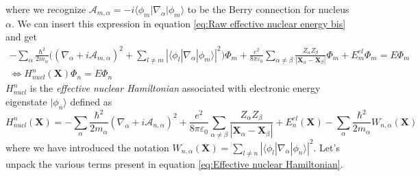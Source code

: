 \documentclass[11pt,a4paper]{article}
\begin{document}
where we recognize $\boldsymbol{\mathcal{A}}_{m,\alpha} = -i \langle\phi_m | \nabla_\alpha | \phi_m\rangle$ to be the Berry connection for nucleus $\alpha$.
We can insert this expression in equation \eqref{eq:Raw effective nuclear energy bis} and get
\begin{equation*}
	\begin{gathered}
		-\sum_\alpha \frac{\hbar^2}{2m_\alpha} \Big( (\nabla_\alpha + i\boldsymbol{\mathcal{A}}_{m,\alpha})^2 + \sum_{l \neq m} |\langle\phi_l | \nabla_\alpha | \phi_m\rangle|^2 \Big) \Phi_m + \frac{e^2}{8\pi\varepsilon_0} \sum_{\alpha \neq \beta} \frac{Z_\alpha Z_\beta}{|\mathbf{X}_\alpha - \mathbf{X}_\beta|} \Phi_m + E_m^{el} \Phi_m = E \Phi_m \\[6pt]
		\Leftrightarrow H_{nucl}^n(\mathbf{X}) \Phi_n = E \Phi_n
	\end{gathered}
\end{equation*}
$H_{nucl}^n$ is the \emph{effective nuclear Hamiltonian} associated with electronic energy eigenstate $|\phi_n\rangle$ defined as
\begin{equation}
	\label{eq:Effective nuclear Hamiltonian}
	H_{nucl}^n(\mathbf{X}) = -\sum_\alpha \frac{\hbar^2}{2m_\alpha} (\nabla_\alpha + i\boldsymbol{\mathcal{A}}_{n,\alpha})^2 + \frac{e^2}{8\pi\varepsilon_0} \sum_{\alpha \neq \beta} \frac{Z_\alpha Z_\beta}{|\mathbf{X}_\alpha - \mathbf{X}_\beta|} + E_n^{el}(\mathbf{X}) - \sum_\alpha \frac{\hbar^2}{2m_\alpha} W_{n,\alpha}(\mathbf{X})
\end{equation}
where we have introduced the notation $W_{n,\alpha}(\mathbf{X}) = \sum_{l \neq n} |\langle\phi_l | \nabla_\alpha | \phi_n\rangle|^2$. Let’s unpack the various terms present in equation \eqref{eq:Effective nuclear Hamiltonian}.
\end{document}
